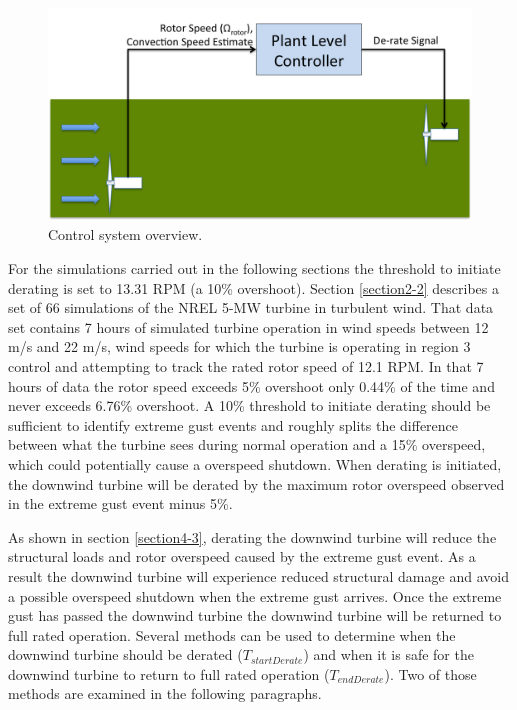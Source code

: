 \begin{figure}[htb]
	\centering
		\includegraphics[width = \linewidth]{Figures/ch4Figures/fig4-20.png}
		
	\caption{Control system overview.}
	\label{fig4-20}
\end{figure}


For the simulations carried out in the following sections the threshold to initiate derating is set to 13.31 RPM (a 10\% overshoot). Section \ref{section2-2} describes a set of 66 simulations of the NREL 5-MW turbine in turbulent wind. That data set contains 7 hours of simulated turbine operation in wind speeds between 12 m/s and 22 m/s, wind speeds for which the turbine is operating in region 3 control and attempting to track the rated rotor speed of 12.1 RPM. In that 7 hours of data the rotor speed exceeds 5\% overshoot only 0.44\% of the time and never exceeds 6.76\% overshoot. A 10\% threshold to initiate derating should be sufficient to identify extreme gust events and roughly splits the difference between what the turbine sees during normal operation and a 15\% overspeed, which could potentially cause a overspeed shutdown. When derating is initiated, the downwind turbine will be derated by the maximum rotor overspeed observed in the extreme gust event minus 5\%. 

As shown in section \ref{section4-3}, derating the downwind turbine will reduce the structural loads and rotor overspeed caused by the extreme gust event. As a result the downwind turbine will experience reduced structural damage and avoid a possible overspeed shutdown when the extreme gust arrives. Once the extreme gust has passed the downwind turbine the downwind turbine will be returned to full rated operation. Several methods can be used to determine when the downwind turbine should be derated ($T_{startDerate}$) and when it is safe for the downwind turbine to return to full rated operation ($T_{endDerate}$). Two of those methods are examined in the following paragraphs.

